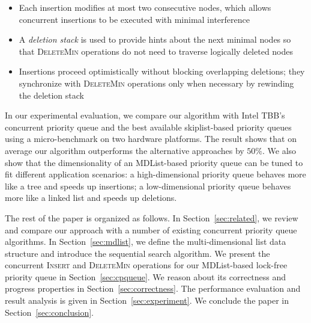 \documentclass[10pt,journal,letterpaper,compsoc]{IEEEtran}
\begin{document}
\begin{itemize}
    \item Each insertion modifies at most two consecutive nodes, which allows concurrent insertions to be executed with minimal interference
    \item A \emph{deletion stack} is used to provide hints about the next minimal nodes so that \textsc{DeleteMin} operations do not need to traverse logically deleted nodes
    \item Insertions proceed optimistically without blocking overlapping deletions; they synchronize with \textsc{DeleteMin} operations only when necessary by rewinding the deletion stack
\end{itemize}

In our experimental evaluation, we compare our algorithm with Intel TBB's concurrent priority queue and the best available skiplist-based priority queues using a micro-benchmark on two hardware platforms. 
The result shows that on average our algorithm outperforms the alternative approaches by $50\%$.
We also show that the dimensionality of an MDList-based priority queue can be tuned to fit different application scenarios: a high-dimensional priority queue behaves more like a tree and speeds up insertions; a low-dimensional priority queue behaves more like a linked list and speeds up deletions.

The rest of the paper is organized as follows. 
In Section~\ref{sec:related}, we review and compare our approach with a number of existing concurrent priority queue algorithms.
In Section~\ref{sec:mdlist}, we define the multi-dimensional list data structure and introduce the sequential search algorithm.
We present the concurrent \textsc{Insert} and \textsc{DeleteMin} operations for our MDList-based lock-free priority queue in Section~\ref{sec:cpqueue}.
We reason about its correctness and progress properties in Section~\ref{sec:correctness}.
The performance evaluation and result analysis is given in Section~\ref{sec:experiment}.
We conclude the paper in Section~\ref{sec:conclusion}.
\end{document}
